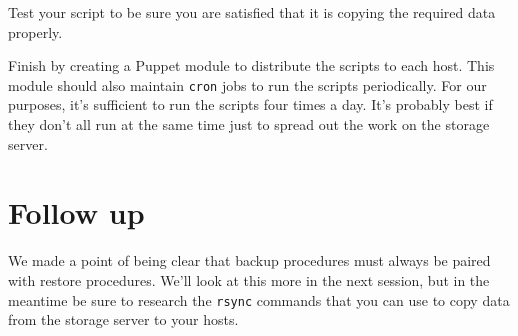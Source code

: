 \documentclass{article}   	%
\begin{document}
Test your script to be sure you are satisfied that it is copying the required data properly.

Finish by creating a Puppet module to distribute the scripts to each host. This module should also maintain \texttt{cron} jobs to run the scripts periodically. For our purposes, it's sufficient to run the scripts four times a day. It's probably best if they don't all run at the same time just to spread out the work on the storage server.

\section{Follow up}
We made a point of being clear that backup procedures must always be paired with restore procedures. We'll look at this more in the next session, but in the meantime be sure to research the \texttt{rsync} commands that you can use to copy data from the storage server to your hosts.

  
\end{document}
